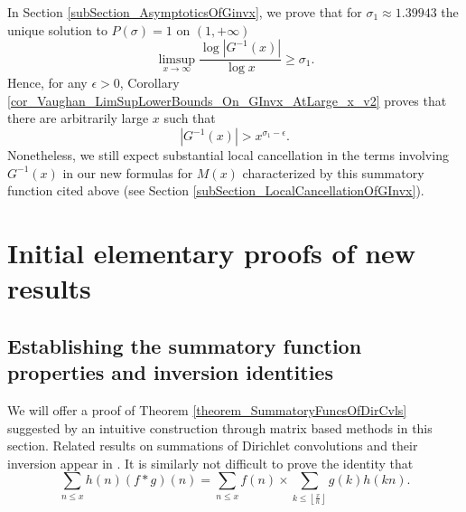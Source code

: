 \documentclass[11pt,reqno,a4letter]{article}
\numberwithin{figure}{section}
\numberwithin{table}{section}
\newcommand{\cf}{\textit{cf.\ }}
\newcommand{\Floor}[2]{\ensuremath{\left\lfloor \frac{#1}{#2} \right\rfloor}}
\theoremstyle{plain}
\numberwithin{theorem}{section}
\theoremstyle{definition}
\begin{document}
In Section \ref{subSection_AsymptoticsOfGinvx}, we prove that for 
$\sigma_1 \approx 1.39943$ the unique solution to $P(\sigma) = 1$ on 
$(1, +\infty)$ 
\[
\limsup_{x \rightarrow \infty} \frac{\log|G^{-1}(x)|}{\log x} \geq \sigma_1. 
\]
Hence, for any $\epsilon > 0$, 
Corollary \ref{cor_Vaughan_LimSupLowerBounds_On_GInvx_AtLarge_x_v2} 
proves that there are arbitrarily large $x$ such that 
\[
|G^{-1}(x)| > x^{\sigma_1-\epsilon}. 
\]
Nonetheless, we still expect substantial local cancellation in the terms involving 
$G^{-1}(x)$ in our new formulas for $M(x)$ characterized by this summatory function 
cited above (see Section \ref{subSection_LocalCancellationOfGInvx}). 

\newpage 
\section{Initial elementary proofs of new results} 
\label{Section_PrelimProofs_Config} 

\subsection{Establishing the summatory function properties and inversion identities} 
\label{subSection_PrelimProofs_Config_InversionTheorem}

We will offer a proof of Theorem \ref{theorem_SummatoryFuncsOfDirCvls} 
suggested by an intuitive construction through matrix based methods in this section. 
Related results on summations of Dirichlet convolutions and their inversion appear in 
\cite[\S 2.14; \S 3.10; \S 3.12; \cf \S 4.9, p.\ 95]{APOSTOLANUMT}. 
It is similarly not difficult to prove the identity that
\[
\sum_{n \leq x} h(n) (f \ast g)(n) = 
     \sum_{n \leq x} f(n) \times \sum_{k \leq \Floor{x}{n}} g(k) h(kn). 
\]
\end{document}
